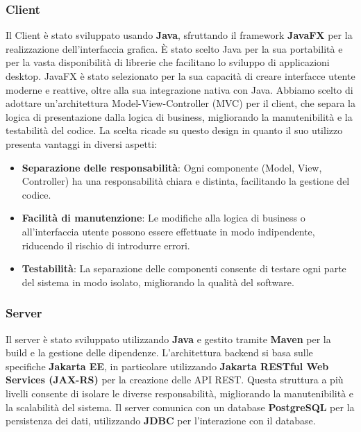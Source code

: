 \subsubsection{Client}
Il Client è stato sviluppato usando \textbf{Java}, sfruttando il framework \textbf{JavaFX} per la realizzazione dell'interfaccia grafica.
È stato scelto Java per la sua portabilità e per la vasta disponibilità di librerie che facilitano lo sviluppo di applicazioni desktop.
JavaFX è stato selezionato per la sua capacità di creare interfacce utente moderne e reattive, oltre alla sua integrazione nativa con Java.
Abbiamo scelto di adottare un'architettura Model-View-Controller (MVC) per il client, che separa la logica di presentazione dalla logica di business,
migliorando la manutenibilità e la testabilità del codice. La scelta ricade su questo design in quanto
il suo utilizzo presenta vantaggi in diversi aspetti: 
\begin{itemize}
    \item \textbf{Separazione delle responsabilità}: Ogni componente (Model, View, Controller) ha una responsabilità chiara e distinta, 
    facilitando la gestione del codice.
    \item \textbf{Facilità di manutenzione}: Le modifiche alla logica di business o all'interfaccia utente possono essere effettuate in modo indipendente,
    riducendo il rischio di introdurre errori.
    \item \textbf{Testabilità}: La separazione delle componenti consente di testare ogni parte del sistema in modo isolato, migliorando la qualità del software.
\end{itemize}

\subsubsection{Server}
Il server è stato sviluppato utilizzando \textbf{Java} e gestito tramite \textbf{Maven} per la build e la gestione delle dipendenze. L'architettura backend si basa sulle specifiche 
\textbf{Jakarta EE}, in particolare utilizzando \textbf{Jakarta RESTful Web Services (JAX-RS)} per la creazione delle API REST.
Questa struttura a più livelli consente di isolare le diverse responsabilità, migliorando la manutenibilità e la scalabilità del sistema.
Il server comunica con un database \textbf{PostgreSQL} per la persistenza dei dati, utilizzando \textbf{JDBC} per l'interazione con il database.
\\

